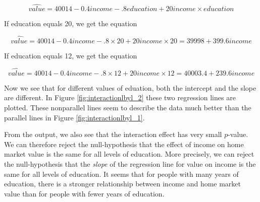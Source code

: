 \begin{equation}
\widehat{value}= 40014 -0.4 income -.8 education + 20 income \times education
\end{equation}

If education equals 20, we get the equation

\begin{equation}
\widehat{value}= 40014 -0.4 income -.8 \times 20 + 20 income \times 20 = 39998 + 399.6 income
\end{equation}

If education equals 12, we get the equation 

\begin{equation}
\widehat{value}= 40014 - 0.4 income -.8 \times 12 + 20 income \times 12 = 40003.4 + 239.6 income
\end{equation}

Now we see that for different values of eduation, both the intercept and the slope are different. In Figure \ref{fig:interactionlbyl_2} these two regression lines are plotted. These nonparallel lines seem to describe the data much better than the parallel lines in Figure \ref{fig:interactionlbyl_1}. 

\begin{kframe}


{\ttfamily\noindent\bfseries{}}

{\ttfamily\noindent\bfseries{}}\end{kframe}

From the output, we also see that the interaction effect has very small $p$-value. We can therefore reject the null-hypothesis that the effect of income on home market value is the same for all levels of education. More precisely, we can reject the null-hypothesis that the \textit{slope} of the regression line for value on income is the same for all levels of education. It seems that for people with many years of education, there is a stronger relationship between income and home market value than for people with fewer years of education. 

